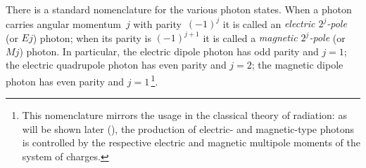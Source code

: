 There is a standard nomenclature for the various photon states. When a photon carries angular momentum~$j$ with parity~$(-1)^j$ it is called an \emph{electric $2^j$-pole} (or $Ej$) photon; when its parity is $(-1)^{j+1}$ it is called a \emph{magnetic $2^j$-pole} (or $Mj$) photon. In particular, the electric dipole photon has odd parity and $j = 1$; the electric quadrupole photon has even parity and $j = 2$; the magnetic dipole photon has even parity and $j = 1$\,\footnote{This nomenclature mirrors the usage in the classical theory of radiation: as will be shown later (), the production of electric- and magnetic-type photons is controlled by the respective electric and magnetic multipole moments of the system of charges.}.
